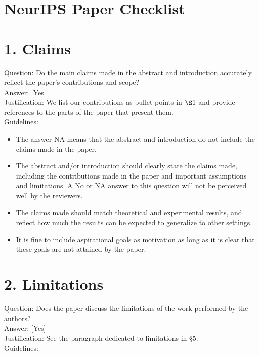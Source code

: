 \documentclass[10pt]{article}
\begin{document}
\section*{NeurIPS Paper Checklist}
\section*{1. Claims}
Question: Do the main claims made in the abstract and introduction accurately reflect the paper's contributions and scope?\\[0pt]
Answer: [Yes]\\
Justification: We list our contributions as bullet points in $\S 1$ and provide references to the parts of the paper that present them.\\
Guidelines:

\begin{itemize}
  \item The answer NA means that the abstract and introduction do not include the claims made in the paper.
  \item The abstract and/or introduction should clearly state the claims made, including the contributions made in the paper and important assumptions and limitations. A No or NA answer to this question will not be perceived well by the reviewers.
  \item The claims made should match theoretical and experimental results, and reflect how much the results can be expected to generalize to other settings.
  \item It is fine to include aspirational goals as motivation as long as it is clear that these goals are not attained by the paper.
\end{itemize}

\section*{2. Limitations}
Question: Does the paper discuss the limitations of the work performed by the authors?\\[0pt]
Answer: [Yes]\\
Justification: See the paragraph dedicated to limitations in §5.\\
Guidelines:
\end{document}
